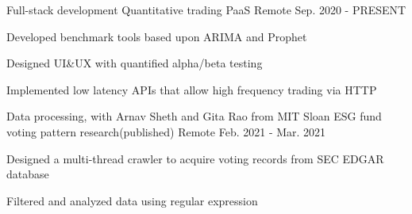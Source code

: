 \begin{cventries}
  \cventry
    {Full-stack development}
    {Quantitative trading PaaS}
    {Remote}
    {Sep. 2020 - PRESENT}
    {
      \begin{cvitems}
        \item {Developed benchmark tools based upon ARIMA and Prophet}
        \item {Designed UI\&UX with quantified alpha/beta testing}
        \item {Implemented low latency APIs that allow high frequency trading via HTTP}
      \end{cvitems}
    }

  \cventry
    {Data processing, with Arnav Sheth and Gita Rao from MIT Sloan}
    {ESG fund voting pattern research(published)}
    {Remote}
    {Feb. 2021 - Mar. 2021}
    {
      \begin{cvitems}
        \item {Designed a multi-thread crawler to acquire voting records from SEC EDGAR database}
        \item {Filtered and analyzed data using regular expression}
      \end{cvitems}
    }
  \begin{comment}
  \cventry
    {Literature review \& Data analysis}
    {Re-examine recessional velocity based upon a `variable' Hubble constant}
    {San Francisco, United States}
    {Nov. 2018}
    {
      \begin{cvitems}
        \item {Provided a unified framework for existing theories and explanations}
        \item {Quantified recessional velocity index using linear regression}
      \end{cvitems}
    }

  \cventry
    {Data collection \& Analysis}
    {San Francisco rising sea level monitoring and prognosis}
    {San Francisco, United States}
    {Dec. 2018}
    {
      \begin{cvitems}
        \item {Extensively sampled sea level and ecological data along San Francisco coastline}
        \item {Validated results with ex ante probit model based upon historical data}
        \item {Performed a case study with SFO's designers on city planning}
      \end{cvitems}
    }
  \end{comment}
\end{cventries}
